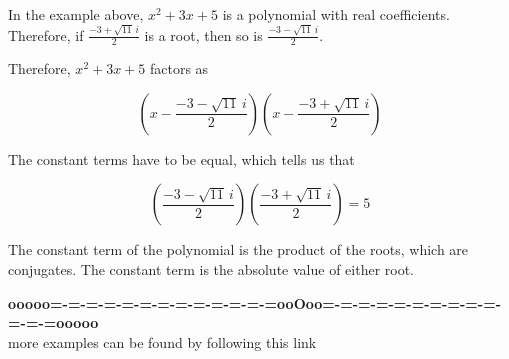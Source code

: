 \documentclass{ximera}
\begin{document}
\begin{observation}

In the example above, $x^2 + 3x + 5$ is a polynomial with real coefficients.  Therefore, if $\frac{-3 + \sqrt{11} \, i}{2}$ is a root, then so is $\frac{-3 - \sqrt{11} \, i}{2}$.



Therefore, $x^2 + 3x + 5$ factors as



\[ \left( x - \frac{-3 - \sqrt{11} \, i}{2} \right)  \left( x - \frac{-3 + \sqrt{11} \, i}{2} \right)    \]


The constant terms have to be equal, which tells us that 


\[    \left( \frac{-3 - \sqrt{11} \, i}{2} \right)  \left( \frac{-3 + \sqrt{11} \, i}{2} \right)  = 5    \]




The constant term of the polynomial is the product of the roots, which are conjugates.  The constant term is the absolute value of either root.





\end{observation}













\begin{center}
\textbf{\textcolor{green!50!black}{ooooo=-=-=-=-=-=-=-=-=-=-=-=-=ooOoo=-=-=-=-=-=-=-=-=-=-=-=-=ooooo}} \\

more examples can be found by following this link\\ 

\end{center}
\end{document}
